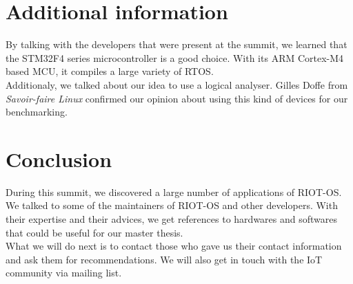 \documentclass[journal, a4paper]{../IEEEtran}
\begin{document}

\section{Additional information}
By talking with the developers that were present at the summit, we learned that the STM32F4 series microcontroller is a good choice. 
With its ARM Cortex-M4 based MCU, it compiles a large variety of RTOS. \\

Additionaly, we talked about our idea to use a logical analyser. 
Gilles Doffe from \textit{Savoir-faire Linux} confirmed our opinion about using this kind of devices for our benchmarking.




\section{Conclusion}
During this summit, we discovered a large number of applications of RIOT-OS.
We talked to some of the maintainers of RIOT-OS and other developers. 
With their expertise and their advices, we get references to hardwares and softwares that could be useful for our master thesis. \\

What we will do next is to contact those who gave us their contact information and ask them for recommendations. We will also get in touch with the IoT community via mailing list. 
\end{document}
